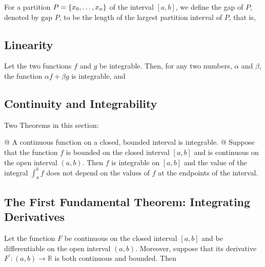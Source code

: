    \begin{definition}
        For a partition $P={\left\{ x_0, \ldots, x_n \right\}}$ of the interval $[a, b]$, we define the gap of $P$, denoted by
        $\text{gap } P$, to be the length of the largest partition interval of $P$, that is,
    \end{definition}

    \subsection{Linearity}
    \begin{thm}
        Let the two functions $f$ and $g$ be integrable. Then, for any two numbers, $\alpha$ and $\beta$, the function
        $\alpha f + \beta g$ is integrable, and
    \end{thm}

    \subsection{Continuity and Integrability}
    \begin{thm}
        Two Theorems in this section:

        \begin{easylist}[enumerate]
            @ A continuous function on a closed, bounded interval is integrable.
            @ Suppose that the function $f$ is bounded on the closed interval $[a, b]$ and is continuous on the open
            interval $(a, b)$. Then $f$ is integrable on $[a, b]$ and the value of the integral $\int_a^b f$ does not
            depend on the values of $f$ at the endpoints of the interval.
        \end{easylist}
    \end{thm}

    \subsection{The First Fundamental Theorem: Integrating Derivatives}
    \begin{thm}
        Let the function $F$ be continuous on the closed interval $[a, b]$ and be differentiable on the open interval
        $(a, b)$. Moreover, suppose that its derivative $F^\prime:(a, b) \to\mathbb{R}$ is both continuous and bounded.
        Then
    \end{thm}

